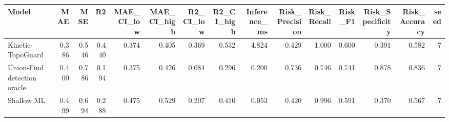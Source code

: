 \begin{tabular}{lrrrrrrrrrrrrrr}
\toprule
Model & MAE & MSE & R2 & MAE\_CI\_low & MAE\_CI\_high & R2\_CI\_low & R2\_CI\_high & Inference\_ms & Risk\_Precision & Risk\_Recall & Risk\_F1 & Risk\_Specificity & Risk\_Accuracy & seed \\
\midrule
Kinetic-TopoGuard & 0.386 & 0.546 & 0.440 & 0.374 & 0.405 & 0.369 & 0.532 & 4.824 & 0.429 & 1.000 & 0.600 & 0.391 & 0.582 & 7 \\
Union-Find detection oracle & 0.400 & 0.786 & 0.194 & 0.375 & 0.426 & 0.084 & 0.296 & 0.200 & 0.736 & 0.746 & 0.741 & 0.878 & 0.836 & 7 \\
Shallow ML & 0.499 & 0.694 & 0.288 & 0.475 & 0.529 & 0.207 & 0.410 & 0.053 & 0.420 & 0.996 & 0.591 & 0.370 & 0.567 & 7 \\
\bottomrule
\end{tabular}